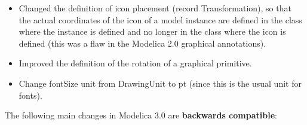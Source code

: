 \documentclass[10pt,a4paper]{report}
\begin{document}
\begin{itemize}
\item
  Changed the definition of icon placement (record Transformation), so
  that the actual coordinates of the icon of a model instance are
  defined in the class where the instance is defined and no longer in
  the class where the icon is defined (this was a flaw in the Modelica
  2.0 graphical annotations).
\item
  Improved the definition of the rotation of a graphical primitive.
\item
  Change fontSize unit from DrawingUnit to pt (since this is the usual
  unit for fonts).
\end{itemize}

The following main changes in Modelica 3.0 are \textbf{backwards
compatible}:
\end{document}
